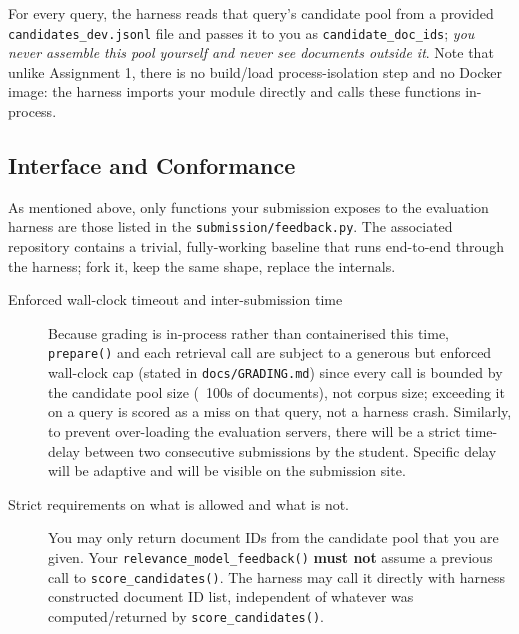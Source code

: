 \documentclass[10pt]{article}
\begin{document}
For every query, the harness reads that query's candidate pool from a provided \texttt{candidates\_dev.jsonl} file and passes it to you as \texttt{candidate\_doc\_ids}; \emph{you never assemble this pool yourself and never see documents outside it}. Note that unlike Assignment 1, there is no build/load process-isolation step and no Docker image: the harness imports your module directly and calls these functions in-process. 


\subsection{Interface and Conformance} 
As mentioned above, only functions your submission exposes to the evaluation harness are those listed in the \texttt{submission/feedback.py}. The associated repository contains a trivial, fully-working baseline that runs end-to-end through the harness; fork it, keep the same shape, replace the internals.

\begin{description}
\item [Enforced wall-clock timeout and inter-submission time] Because grading is in-process rather than containerised this time, \texttt{prepare()} and each retrieval call are subject to a generous but enforced wall-clock cap (stated in \texttt{docs/GRADING.md}) since every call is bounded by the candidate pool size (~100s of documents), not corpus size; exceeding it on a query is scored as a miss on that query, not a harness crash. Similarly, to prevent over-loading the evaluation servers, there will be a strict time-delay between two consecutive submissions by the student. Specific delay will be adaptive and will be visible on the submission site. 

\item [Strict requirements on what is allowed and what is not.] You may only return document IDs from the candidate pool that you are given. Your \texttt{relevance\_model\_feedback()} \textbf{must not} assume a previous call to \texttt{score\_candidates()}. The harness may call it directly with harness constructed document ID list, independent of whatever was computed/returned by \texttt{score\_candidates()}. 
\end{description}
\end{document}
